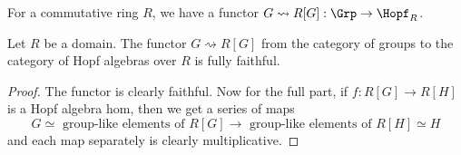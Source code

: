 \begin{definition}
  \label{0-grp-alg}
  \uses{}
  \leanok

  For a commutative ring $R$, we have a functor $G \rightsquigarrow R[G] : \Grp \to \Hopf_R$.
\end{definition}


\begin{proposition}
  \label{0-full-faithful-grp-alg}
  \leanok

  Let $R$ be a domain.
  The functor $G \rightsquigarrow R[G]$ from the category of groups to the category of Hopf algebras over $R$ is fully faithful.
\end{proposition}
\begin{proof}
  \leanok

  The functor is clearly faithful.
  Now for the full part, if $f : R[G] \to R[H]$ is a Hopf algebra hom, then we get a series of maps
  \[
    G \simeq \text{ group-like elements of } R[G] \to \text{ group-like elements of } R[H] \simeq H
  \]
  and each map separately is clearly multiplicative.
\end{proof}

